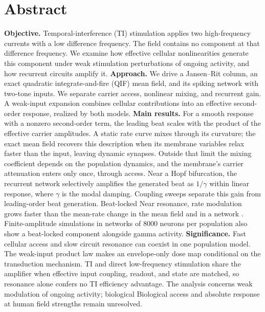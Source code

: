 \documentclass[11pt,a4paper]{article}
\newif\ifjne
\providecommand{\DIFaddtex}[1]{{\protect\color{blue} \sf #1}} %
\providecommand{\DIFdeltex}[1]{{\protect\color{red} \scriptsize #1}} %
\providecommand{\DIFaddbegin}{} %
\providecommand{\DIFaddend}{} %
\providecommand{\DIFdelbegin}{} %
\providecommand{\DIFdelend}{} %
\providecommand{\DIFadd}[1]{\texorpdfstring{\DIFaddtex{#1}}{#1}} %
\providecommand{\DIFdel}[1]{\texorpdfstring{\DIFdeltex{#1}}{}} %
\begin{document}
\section*{Abstract}
\ifjne
\noindent
\textbf{Objective.} Temporal-interference (TI) stimulation applies two high-frequency
currents with a low difference frequency. The field contains no component at that
difference frequency. We examine how \DIFdelbegin \DIFdel{effective }\DIFdelend cellular nonlinearities generate this component
under weak \DIFdelbegin \DIFdel{stimulation }\DIFdelend \DIFaddbegin \DIFadd{perturbations of ongoing activity, }\DIFaddend and how recurrent circuits amplify it.
\textbf{Approach.} We drive a Jansen--Rit column, an exact quadratic integrate-and-fire
(QIF) mean field, and its spiking network with two-tone inputs. We separate carrier
access, nonlinear mixing, and recurrent gain. A weak-input expansion combines cellular
contributions into an effective second-order response, realized by both models.
\textbf{Main results.} For a smooth response with a nonzero second-order term, the
leading beat scales with the product of the effective carrier amplitudes.
A static rate curve mixes through its curvature;
the exact mean field recovers this description when its membrane variables relax faster
than the input, leaving dynamic synapses. Outside that limit the mixing coefficient
depends on the population dynamics, and the membrane's carrier attenuation enters
only once, through access. Near a Hopf
bifurcation, the recurrent network selectively amplifies the generated beat as
$1/\gamma$ within linear response, where $\gamma$ is the modal damping. Coupling sweeps
separate this gain from leading-order beat generation. \DIFdelbegin \DIFdel{Beat-locked }\DIFdelend \DIFaddbegin \DIFadd{Near resonance, }\DIFaddend rate modulation
grows faster than the mean-rate change\DIFdelbegin \DIFdel{in the mean field and in a network }\DIFdelend \DIFaddbegin \DIFadd{. Finite-amplitude simulations in networks }\DIFaddend of
$8000$ neurons per population \DIFaddbegin \DIFadd{also show a beat-locked component alongside gamma activity}\DIFaddend .
\textbf{Significance.} Fast cellular access and slow circuit resonance can coexist in
one population model. The weak-input product law makes an envelope-only dose map
conditional on the transduction mechanism. TI and direct low-frequency stimulation
share the amplifier when effective input coupling, readout, and state are matched, so
resonance alone confers no TI efficiency advantage. \DIFdelbegin \DIFdel{The analysis concerns weak modulation of ongoing activity; biological }\DIFdelend \DIFaddbegin \DIFadd{Biological }\DIFaddend access and absolute
response at human field strengths remain unresolved.
\end{document}
